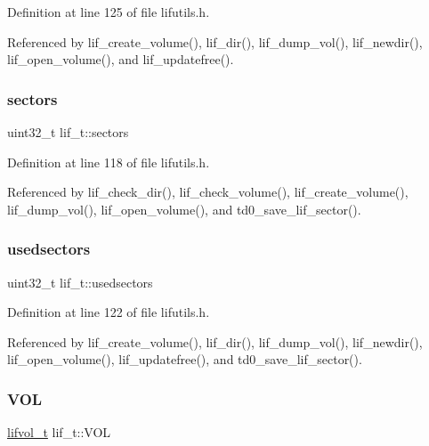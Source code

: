 Definition at line 125 of file lifutils.\+h.



Referenced by lif\+\_\+create\+\_\+volume(), lif\+\_\+dir(), lif\+\_\+dump\+\_\+vol(), lif\+\_\+newdir(), lif\+\_\+open\+\_\+volume(), and lif\+\_\+updatefree().

\mbox{\label{structlif__t_a262b14d8547abff49d9dd1b445faf6d5}} 
\subsubsection{\texorpdfstring{sectors}{sectors}}
{\footnotesize\ttfamily uint32\+\_\+t lif\+\_\+t\+::sectors}



Definition at line 118 of file lifutils.\+h.



Referenced by lif\+\_\+check\+\_\+dir(), lif\+\_\+check\+\_\+volume(), lif\+\_\+create\+\_\+volume(), lif\+\_\+dump\+\_\+vol(), lif\+\_\+open\+\_\+volume(), and td0\+\_\+save\+\_\+lif\+\_\+sector().

\mbox{\label{structlif__t_ad81767a2f65b997d5abecba130b89814}} 
\subsubsection{\texorpdfstring{usedsectors}{usedsectors}}
{\footnotesize\ttfamily uint32\+\_\+t lif\+\_\+t\+::usedsectors}



Definition at line 122 of file lifutils.\+h.



Referenced by lif\+\_\+create\+\_\+volume(), lif\+\_\+dir(), lif\+\_\+dump\+\_\+vol(), lif\+\_\+newdir(), lif\+\_\+open\+\_\+volume(), lif\+\_\+updatefree(), and td0\+\_\+save\+\_\+lif\+\_\+sector().

\mbox{\label{structlif__t_ae68126d2b9261ef9a6903a95d5c82cac}} 
\subsubsection{\texorpdfstring{V\+OL}{VOL}}
{\footnotesize\ttfamily \hyperlink{structlifvol__t}{lifvol\+\_\+t} lif\+\_\+t\+::\+V\+OL}



